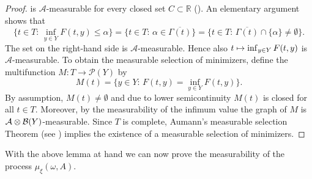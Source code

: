 \documentclass[10pt]{amsart}
\def\mto{\mathchoice{\longmapsto}{\mapsto}{\mapsto}{\mapsto}}
\theoremstyle{definition}
\let\w\omega
\newcommand{\R}{\mathbb{R}}
\begin{document}
\begin{proof}
is $\mathcal{A}$-measurable for every closed set $C\subset \R$ (\cf \cite[Rem.\,6.4]{FoLe}). An elementary argument shows that\vspace*{-3pt}
\begin{equation*}
\{t\in T:\, \inf_{y\in Y}F(t,y)\leq\alpha\}=\{t\in T:\,\alpha\in \overline{\Gamma(t)}\}=\{t\in T:\, \overline{\Gamma(t)}\cap \{\alpha\}\neq\emptyset\}.
\end{equation*}
The set on the right-hand side is $\mathcal{A}$-measurable. Hence also $t\mto \inf_{y\in Y}F(t,y)$ is $\mathcal{A}$-measurable. To obtain the measurable selection of minimizers, define the multifunction $M:T\to\mathcal{P}(Y)$ by\vspace*{-3pt}
\begin{equation*}
M(t)=\{y\in Y:\,F(t,y)=\inf_{y\in Y}F(t,y)\}.
\end{equation*}
By assumption, $M(t)\neq\emptyset$ and due to lower semicontinuity $M(t)$ is closed for all $t\in T$. Moreover, by the measurability of the infimum value the graph of $M$ is $\mathcal{A}\otimes\nobreak\mathcal{B}(Y)$\nobreakdash-measurable. Since $T$ is complete, Aumann's measurable selection Theorem (see \cite[Th.\,6.10]{FoLe}) implies the existence of a measurable selection of minimizers.
\end{proof}
With the above lemma at hand we can now prove the measurability of the process $\mu_{\xi}(\w,A)$.
\end{document}
